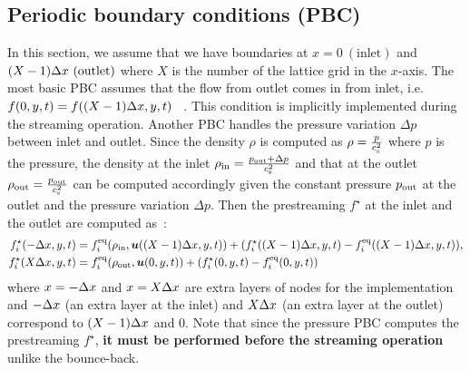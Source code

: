 \subsection{Periodic boundary conditions (PBC)}
In this section, we assume that we have
boundaries at $x = 0~(\text{inlet})$ and $(X - 1)\Delta x~(\text{outlet})$
where $X$ is the number of the lattice grid in the $x$-axis.
The most basic PBC assumes that
the flow from outlet comes in from inlet, i.e.
$f(0, y, t) = f((X - 1)\Delta x, y, t)$
~\cite{succi2018lattice}.
This condition is implicitly implemented during the streaming operation.
Another PBC handles
the pressure variation $\Delta p$ between inlet and outlet.
Since the density $\rho$ is computed as $\rho = \frac{p}{c_{\rm s}^2}$
where $p$ is the pressure,
the density at the inlet $\rho_{\rm in} = \frac{p_{\rm out} + \Delta p }{c_{\rm s}^2}$ and
that at the outlet $\rho_{\rm out} = \frac{p_{\rm out}}{c_{\rm s}^2}$ can be computed
accordingly given the constant pressure $p_{\rm out}$
at the outlet and the pressure variation $\Delta p$.
Then the prestreaming $f^\star$ at 
the inlet and the outlet are computed as~\cite{succi2018lattice}:
\begin{equation}
\begin{aligned}
  f_i^\star(-\Delta x, y, t) &=
  f_i^{\rm eq}(\rho_{\rm in}, \boldsymbol{u}((X - 1)\Delta x, y, t))
  + (f_i^\star((X - 1)\Delta x, y, t) - f_i^{\rm eq}((X - 1)\Delta x, y, t)), \\
  f_i^\star(X\Delta x, y, t) &=
  f_i^{\rm eq}(\rho_{\rm out}, \boldsymbol{u}(0, y, t))
  + (f_i^\star(0, y, t) - f_i^{\rm eq}(0, y, t))\\
\end{aligned}
\label{discretized-pbc-pressure}
\end{equation}
where $x = -\Delta x$ and $x = X\Delta x$
are extra layers of nodes for the implementation
and $-\Delta x$ (an extra layer at the inlet) and $X\Delta x$
(an extra layer at the outlet) correspond
to $(X - 1)\Delta x$ and $0$.
Note that since the pressure PBC computes the prestreaming $f^\star$,
{\bf it must be performed before the streaming operation} unlike the bounce-back.